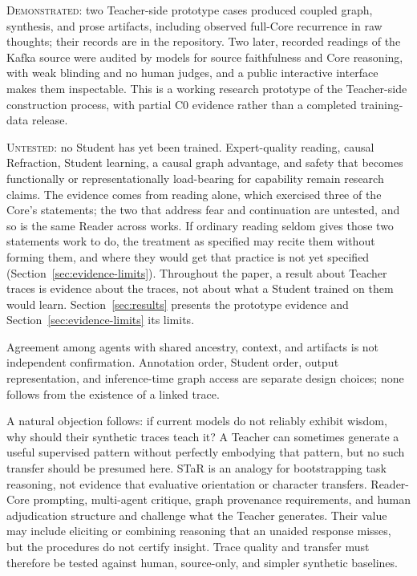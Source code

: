 \documentclass[11pt]{article}
\newcommand{\statusDemonstrated}{\textcolor{implementedGreen}{\textsc{Demonstrated}}}
\newcommand{\statusUntested}{\textcolor{hypothesisBlue}{\textsc{Untested}}}
\begin{document}
\begin{claimbox}
\statusDemonstrated: two Teacher-side prototype cases produced coupled graph,
synthesis, and prose artifacts, including observed full-Core recurrence in raw
thoughts; their records are in the repository. Two later, recorded readings of the Kafka source were audited
by models for source faithfulness and Core reasoning, with weak blinding and no human judges, and a public interactive interface makes them inspectable. This is a working research prototype of the
Teacher-side construction process, with partial C0 evidence rather than a
completed training-data release.

\statusUntested: no Student has yet been trained. Expert-quality reading,
causal Refraction, Student learning, a causal graph advantage, and safety that
becomes functionally or representationally load-bearing for capability remain
research claims. The evidence comes from reading alone, which exercised three
of the Core's statements; the two that address fear and continuation are
untested, and so is the same Reader across works. If ordinary reading seldom
gives those two statements work to do, the treatment as specified may recite
them without forming them, and where they would get that practice is not yet
specified (Section~\ref{sec:evidence-limits}). Throughout the paper, a
result about Teacher traces is evidence about the traces, not about what a
Student trained on them would learn. Section~\ref{sec:results} presents the
prototype evidence and Section~\ref{sec:evidence-limits} its limits.
\end{claimbox}

Agreement among agents with shared ancestry, context, and artifacts is
not independent confirmation. Annotation order, Student order, output
representation, and inference-time graph access are separate design choices;
none follows from the existence of a linked trace.

A natural objection follows: if current models do not reliably exhibit wisdom,
why should their synthetic traces teach it? A Teacher can sometimes generate a
useful supervised pattern without perfectly embodying that pattern, but no such
transfer should be presumed here. STaR \cite{zelikman2022star} is an analogy for
bootstrapping task reasoning, not evidence that evaluative orientation or
character transfers. Reader-Core prompting, multi-agent critique, graph
provenance requirements, and human adjudication structure and challenge what
the Teacher generates. Their value may include eliciting or combining reasoning
that an unaided response misses, but the procedures do not certify insight.
Trace quality and transfer must therefore be tested against human, source-only,
and simpler synthetic baselines.
\end{document}
